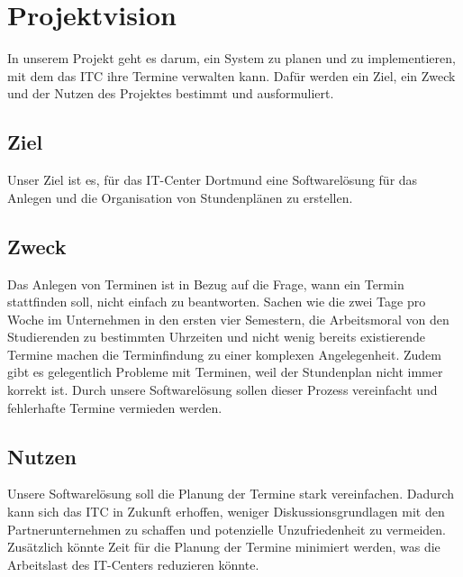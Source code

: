 
\clearpage

\section{Projektvision}
In unserem Projekt geht es darum, ein System zu planen und zu implementieren, mit dem das ITC ihre Termine verwalten kann. Dafür werden ein Ziel, ein Zweck und der Nutzen des Projektes bestimmt und ausformuliert.

\vspace{18pt}

\subsection{Ziel}
Unser Ziel ist es, für das IT-Center Dortmund eine Softwarelösung für das Anlegen und die Organisation von Stundenplänen zu erstellen. 

\vspace{18pt}

\subsection{Zweck}
Das Anlegen von Terminen ist in Bezug auf die Frage, wann ein Termin stattfinden soll, nicht einfach zu beantworten. Sachen wie die zwei Tage pro Woche im Unternehmen in den ersten vier Semestern, die Arbeitsmoral von den Studierenden zu bestimmten Uhrzeiten und nicht wenig bereits existierende Termine machen die Terminfindung zu einer komplexen Angelegenheit. Zudem gibt es gelegentlich Probleme mit Terminen, weil der Stundenplan nicht immer korrekt ist. Durch unsere Softwarelösung sollen dieser Prozess vereinfacht und fehlerhafte Termine vermieden werden.

\vspace{18pt}

\subsection{Nutzen}
Unsere Softwarelösung soll die Planung der Termine stark vereinfachen. Dadurch kann sich das ITC in Zukunft erhoffen, weniger Diskussionsgrundlagen mit den Partnerunternehmen zu schaffen und potenzielle Unzufriedenheit zu vermeiden. Zusätzlich könnte Zeit für die Planung der Termine minimiert werden, was die Arbeitslast des IT-Centers reduzieren könnte.